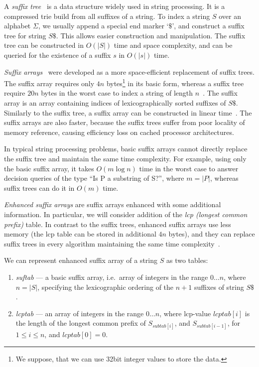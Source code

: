 A \emph{suffix tree}~\cite{suffixtree} is a data structure widely used in string processing. It is a compressed trie build from all suffixes of a string. To index a string $S$ over an alphabet $\Sigma$, we usually append a special end marker `$\$ $', and construct a suffix tree for string $S\$ $.
This allows easier construction and manipulation.
The suffix tree can be constructed in $O(|S|)$ time and space complexity, and can be queried for the existence of a suffix $s$ in $O(|s|)$ time.

\emph{Suffix arrays}~\cite{suffixarray} were developed as a more space-efficient replacement of suffix trees. The suffix array requires only $4n$ bytes\footnote{We suppose, that we can use 32bit integer values to store the data.} in its basic form, whereas a suffix tree require $20n$ bytes in the worst case to index a string of length $n$~\cite{kurtz1999reducing}. The suffix array is an array containing indices of lexicographically sorted suffixes of $S\$ $. Similarly to the suffix tree, a suffix array can be constructed in linear time~\cite{karkkainen2003simple, kim2003linear, ko2003space}. The suffix arrays are also faster, because the suffix trees suffer from poor locality of memory reference, causing efficiency loss on cached processor architectures.

In typical string processing problems, basic suffix arrays cannot directly replace the suffix tree and maintain the same time complexity. For example, using only the basic suffix array, it takes $O(m \log n)$ time in the worst case to answer decision queries of the type ``Is P a substring of S?'', where $m = |P|$, whereas suffix trees can do it in $O(m)$ time.

\emph{Enhanced suffix arrays} are suffix arrays enhanced with some additional information.
In particular, we will consider addition of the \emph{lcp (longest common prefix)} table.
In contrast to the suffix trees, enhanced suffix arrays use less memory (the lcp table can be stored in additional $4n$ bytes), and they can replace suffix trees in every algorithm maintaining the same time complexity~\cite{enhancedsuffixarrays}.

We can represent enhanced suffix array of a string $S$ as two tables:
\begin{enumerate}
  \item \emph{suftab} --- a basic suffix array, i.e.\ array of integers in the range $0\dots n$, where $n = |S|$, specifying the lexicographic ordering of the $n + 1$ suffixes of string $S\$ $.
  \item \emph{lcptab} --- an array of integers in the range $0\dots n$, where lcp-value $lcptab[i]$ is the length of the longest common prefix of $S_{subtab[i]}$, and $S_{subtab[i-1]}$, for $1 \leq i \leq n$, and $lcptab[0] = 0$.
\end{enumerate}


